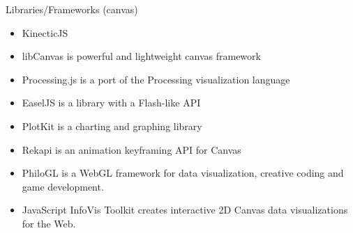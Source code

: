 \documentclass{beamer}
\begin{document}
\begin{frame}{Libraries/Frameworks (canvas)}

\begin{itemize}
\item KinecticJS
\item libCanvas is powerful and lightweight canvas framework
\item Processing.js is a port of the Processing visualization language
\item EaselJS is a library with a Flash-like API
\item PlotKit is a charting and graphing library
\item Rekapi is an animation keyframing API for Canvas
\item PhiloGL is a WebGL framework for data visualization, creative coding and game development.
\item JavaScript InfoVis Toolkit creates interactive 2D Canvas data visualizations for the Web.
\end{itemize}


\end{frame}
\end{document}
